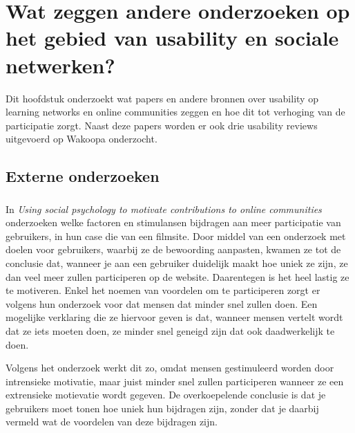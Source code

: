 \documentclass[a4paper, 10pt, pdftex]{report}
\begin{document}
  \newpage
  \chapter{Wat zeggen andere onderzoeken op het gebied van usability en sociale netwerken?}
    \label{researchchapter}
    \newpage

    Dit hoofdstuk onderzoekt wat papers en andere bronnen over usability op learning networks en online communities zeggen en hoe dit tot verhoging van de participatie zorgt. Naast deze papers worden er ook drie usability reviews uitgevoerd op Wakoopa onderzocht.


    \section{Externe onderzoeken}
      \subsection{\cite{Beenen2004}}

      In \emph{Using social psychology to motivate contributions to online communities} onderzoeken \citeauthor{Beenen2004} welke factoren en stimulansen bijdragen aan meer participatie van gebruikers, in hun case die van een filmsite. Door middel van een onderzoek met doelen voor gebruikers, waarbij ze de bewoording aanpasten, kwamen ze tot de conclusie dat, wanneer je aan een gebruiker duidelijk maakt hoe uniek ze zijn, ze dan veel meer zullen participeren op de website. Daarentegen is het heel lastig ze te motiveren. Enkel het noemen van voordelen om te participeren zorgt er volgens hun onderzoek voor dat mensen dat minder snel zullen doen. Een mogelijke verklaring die ze hiervoor geven is dat, wanneer mensen vertelt wordt dat ze iets moeten doen, ze minder snel geneigd zijn dat ook daadwerkelijk te doen.

      Volgens het onderzoek werkt dit zo, omdat mensen gestimuleerd worden door intrensieke motivatie, maar juist minder snel zullen participeren wanneer ze een extrensieke motievatie wordt gegeven. De overkoepelende conclusie is dat je gebruikers moet tonen hoe uniek hun bijdragen zijn, zonder dat je daarbij vermeld wat de voordelen van deze bijdragen zijn.

     \subsection{\cite{Sohn2005}}
\end{document}

